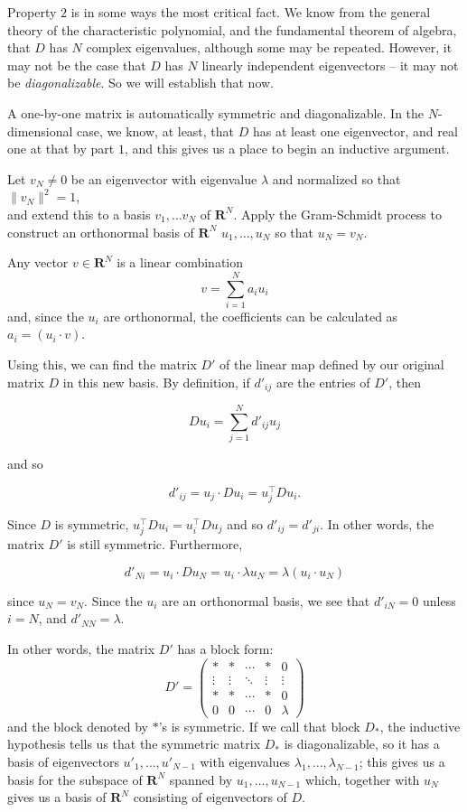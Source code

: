 \documentclass[
]{article}
\begin{document}
Property \(2\) is in some ways the most critical fact. We know from the
general theory of the characteristic polynomial, and the fundamental
theorem of algebra, that \(D\) has \(N\) complex eigenvalues, although
some may be repeated. However, it may not be the case that \(D\) has
\(N\) linearly independent eigenvectors -- it may not be
\emph{diagonalizable}. So we will establish that now.

A one-by-one matrix is automatically symmetric and diagonalizable. In
the \(N\)-dimensional case, we know, at least, that \(D\) has at least
one eigenvector, and real one at that by part \(1\), and this gives us a
place to begin an inductive argument.

Let \(v_{N}\not=0\) be an eigenvector with eigenvalue \(\lambda\) and
normalized so that \(\|v_{N}\|^2=1\),\\
and extend this to a basis \(v_{1},\ldots v_{N}\) of \(\mathbf{R}^{N}\).
Apply the Gram-Schmidt process to construct an orthonormal basis of
\(\mathbf{R}^{N}\) \(u_{1},\ldots, u_{N}\) so that \(u_{N}=v_{N}\).

Any vector \(v\in\mathbf{R}^{N}\) is a linear combination \[
v = \sum_{i=1}^{N} a_{i}u_{i}
\] and, since the \(u_{i}\) are orthonormal, the coefficients can be
calculated as \(a_{i}=(u_{i}\cdot v)\).

Using this, we can find the matrix \(D'\) of the linear map defined by
our original matrix \(D\) in this new basis. By definition, if
\(d'_{ij}\) are the entries of \(D'\), then

\[
Du_{i} = \sum_{j=1}^{N} d'_{ij} u_{j}
\]

and so

\[
d'_{ij} = u_{j}\cdot Du_{i} = u_{j}^{\intercal}Du_{i}.
\]

Since \(D\) is symmetric,
\(u_{j}^{\intercal}Du_{i} =u_{i}^{\intercal}Du_{j}\) and so
\(d'_{ij}=d'_{ji}\). In other words, the matrix \(D'\) is still
symmetric. Furthermore,

\[
d'_{Ni} = u_{i}\cdot Du_{N} = u_{i}\cdot \lambda u_{N} = \lambda (u_{i}\cdot u_{N})
\]

since \(u_{N}=v_{N}\). Since the \(u_{i}\) are an orthonormal basis, we
see that \(d'_{iN}=0\) unless \(i=N\), and \(d'_{NN}=\lambda\).

In other words, the matrix \(D'\) has a block form: \[
D' = \left(\begin{matrix} * & * & \cdots &*  & 0 \\ \vdots & \vdots & \ddots   & \vdots & \vdots \\
* & * & \cdots &*  & 0 \\
0 & 0 & \cdots &0 &\lambda \end{matrix}\right)
\] and the block denoted by \(*\)'s is symmetric. If we call that block
\(D_{*}\), the inductive hypothesis tells us that the symmetric matrix
\(D_{*}\) is diagonalizable, so it has a basis of eigenvectors
\(u'_{1},\ldots, u'_{N-1}\) with eigenvalues
\(\lambda_{1},\ldots, \lambda_{N-1}\); this gives us a basis for the
subspace of \(\mathbf{R}^{N}\) spanned by \(u_{1},\ldots, u_{N-1}\)
which, together with \(u_{N}\) gives us a basis of \(\mathbf{R}^{N}\)
consisting of eigenvectors of \(D\).
\end{document}
